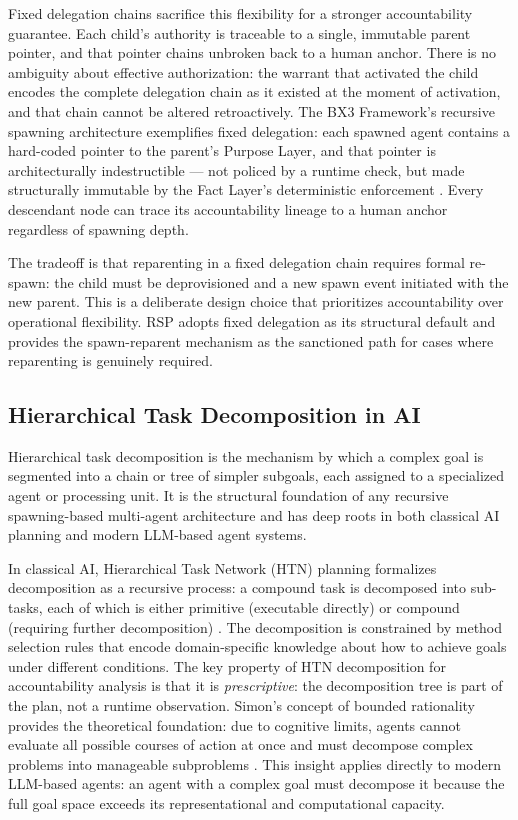Fixed delegation chains sacrifice this flexibility for a stronger accountability guarantee. Each child's authority is traceable to a single, immutable parent pointer, and that pointer chains unbroken back to a human anchor. There is no ambiguity about effective authorization: the warrant that activated the child encodes the complete delegation chain as it existed at the moment of activation, and that chain cannot be altered retroactively. The BX3 Framework's recursive spawning architecture exemplifies fixed delegation: each spawned agent contains a hard-coded pointer to the parent's Purpose Layer, and that pointer is architecturally indestructible — not policed by a runtime check, but made structurally immutable by the Fact Layer's deterministic enforcement \cite{bx3framework,bx3framework2026}. Every descendant node can trace its accountability lineage to a human anchor regardless of spawning depth.

The tradeoff is that reparenting in a fixed delegation chain requires formal re-spawn: the child must be deprovisioned and a new spawn event initiated with the new parent. This is a deliberate design choice that prioritizes accountability over operational flexibility. RSP adopts fixed delegation as its structural default and provides the spawn-reparent mechanism as the sanctioned path for cases where reparenting is genuinely required.

\subsection{Hierarchical Task Decomposition in AI}

Hierarchical task decomposition is the mechanism by which a complex goal is segmented into a chain or tree of simpler subgoals, each assigned to a specialized agent or processing unit. It is the structural foundation of any recursive spawning-based multi-agent architecture and has deep roots in both classical AI planning and modern LLM-based agent systems.

In classical AI, Hierarchical Task Network (HTN) planning formalizes decomposition as a recursive process: a compound task is decomposed into sub-tasks, each of which is either primitive (executable directly) or compound (requiring further decomposition) \cite{htn1993,htn2000}. The decomposition is constrained by method selection rules that encode domain-specific knowledge about how to achieve goals under different conditions. The key property of HTN decomposition for accountability analysis is that it is \emph{prescriptive}: the decomposition tree is part of the plan, not a runtime observation. Simon's concept of bounded rationality provides the theoretical foundation: due to cognitive limits, agents cannot evaluate all possible courses of action at once and must decompose complex problems into manageable subproblems \cite{simon,erpl}. This insight applies directly to modern LLM-based agents: an agent with a complex goal must decompose it because the full goal space exceeds its representational and computational capacity.

